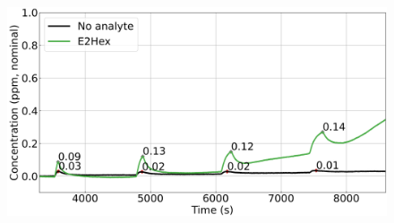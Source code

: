 \documentclass[
  a4paper,
]{scrbook}
\begin{document}
\begin{figure}
\begin{minipage}[t]{0.70\linewidth}
{{\includegraphics{figures/ch6/input_time_comparison_E2Hex.png}

}

}

\end{minipage}%
%
\begin{minipage}[t]{0.15\linewidth}

{\centering 

~

}

\end{minipage}%
\newline
\begin{minipage}[t]{0.11\linewidth}

{\centering 

~

}

\end{minipage}%
%
\begin{minipage}[t]{0.03\linewidth}

{\centering 


}

\end{minipage}%
%
\begin{minipage}[t]{0.01\linewidth}

{\centering 

~

}


\end{minipage}
\end{figure}
\end{document}
